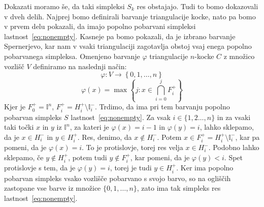 \documentclass[mat1]{fmfdelo}
\newcommand{\I}{\mathbb I}
\newcommand{\0}{\underline{0}}
\begin{document}
\begin{dokaz}
Dokazati moramo še, da taki simpleksi $S_k$ res obstajajo. Tudi to bomo dokazovali v dveh delih. Najprej bomo definirali barvanje triangulacije kocke, nato pa bomo v prvem delu pokazali, da imajo popolno pobarvani simpleksi lastnost~\eqref{eq:nonempty}. Kasneje pa bomo pokazali, da je izbrano barvanje Spernerjevo, kar nam v vsaki triangulaciji zagotavlja obstoj vsaj enega popolno pobarvanega simpleksa. Omenjeno barvanje $\varphi$ triangulacije $n$-kocke $C$ z množico vozlišč $V$ definiramo na naslednji način:
$$\varphi : V \to \left \{ 0, 1, \dots, n \right \}$$
$$\varphi(x) = \max \left \{ j : x \in \bigcap_{i=0}^j F_i^+\right \}$$
Kjer je $ F_0^+ = \I^n$, $ F_i^+ =  H_i^+ \setminus \I_i^-$.
Trdimo, da ima pri tem barvanju popolno pobarvan simpleks $S$ lastnost~\eqref{eq:nonempty}. 
Za vsak $i \in \{1, 2 \dots, n \}$ in za vsaki taki točki $x$ in $y$ iz $\I^n$, za kateri je $\varphi(x) = i - 1$ in $\varphi(y) = i$, lahko sklepamo, da je $x \in H_{i}^-$ in $y \in H_i^+$. Res, denimo, da  $x \notin H_{i}^-$. Potem  $x \in F_i^+ = H_{i}^+ \setminus \I_i^-$, kar pa pomeni, da je $\varphi(x) = i$. To je protislovje, torej res velja $x \in H_{i}^-$. Podobno lahko sklepamo, če $y \notin H_i^+$, potem tudi $y \notin F_i^+$, kar pomeni, da je $\varphi(y) < i$. Spet protislovje s tem, da je $\varphi(y) = i$, torej je tudi $y \in H_i^+$.
Ker ima popolno pobarvan simpleks vsako vozlišče pobarvano s svojo barvo, so na ogliščih zastopane vse barve iz množice $\{ 0, 1, \dots, n \}$, zato ima tak simpleks res lastnost~\eqref{eq:nonempty}. 


\end{dokaz}
\end{document}
